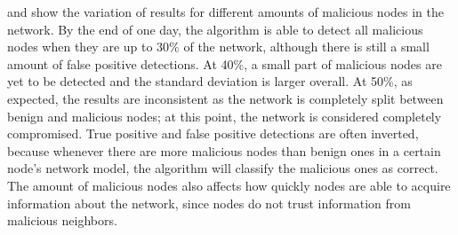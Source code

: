 
\pagebreak
{} and  show the variation of results for different amounts of malicious nodes in the network.
By the end of one day, the algorithm is able to detect all malicious nodes when they are up to 30\% of the network, although there is still a small amount of false positive detections.
At 40\%, a small part of malicious nodes are yet to be detected and the standard deviation is larger overall.
At 50\%, as expected, the results are inconsistent as the network is completely split between benign and malicious nodes; at this point, the network is considered completely compromised.
True positive and false positive detections are often inverted, because whenever there are more malicious nodes than benign ones in a certain node's network model, the algorithm will classify the malicious ones as correct.
The amount of malicious nodes also affects how quickly nodes are able to acquire information about the network, since nodes do not trust information from malicious neighbors.

